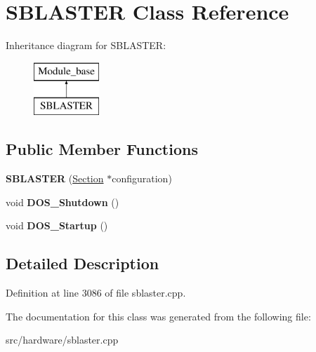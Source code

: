 \hypertarget{classSBLASTER}{\section{S\-B\-L\-A\-S\-T\-E\-R Class Reference}
\label{classSBLASTER}
}
Inheritance diagram for S\-B\-L\-A\-S\-T\-E\-R\-:\begin{figure}[H]
\begin{center}
\leavevmode
\includegraphics[height=2.000000cm]{classSBLASTER}
\end{center}
\end{figure}
\subsection*{Public Member Functions}
\begin{DoxyCompactItemize}
\item 
\hypertarget{classSBLASTER_a2e4295f253cbfbfaf7a09f6958ab884c}{{\bfseries S\-B\-L\-A\-S\-T\-E\-R} (\hyperlink{classSection}{Section} $\ast$configuration)}\label{classSBLASTER_a2e4295f253cbfbfaf7a09f6958ab884c}

\item 
\hypertarget{classSBLASTER_a5914aae53429ba3178b2e88015cffd23}{void {\bfseries D\-O\-S\-\_\-\-Shutdown} ()}\label{classSBLASTER_a5914aae53429ba3178b2e88015cffd23}

\item 
\hypertarget{classSBLASTER_a13b1b3922dde7975afc8da6b0967c569}{void {\bfseries D\-O\-S\-\_\-\-Startup} ()}\label{classSBLASTER_a13b1b3922dde7975afc8da6b0967c569}

\end{DoxyCompactItemize}


\subsection{Detailed Description}


Definition at line 3086 of file sblaster.\-cpp.



The documentation for this class was generated from the following file\-:\begin{DoxyCompactItemize}
\item 
src/hardware/sblaster.\-cpp\end{DoxyCompactItemize}
